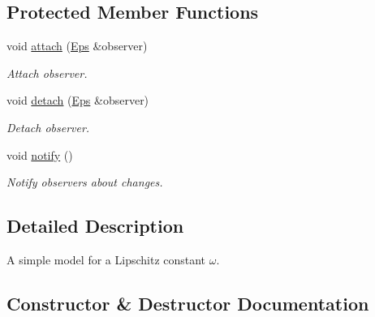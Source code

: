 \subsection*{Protected Member Functions}
\begin{DoxyCompactItemize}
\item 
\hypertarget{classSpacy_1_1Mixin_1_1MixinConnection_abb5520ee6b22dd993d78f142939a1ed4}{}void \hyperlink{classSpacy_1_1Mixin_1_1MixinConnection_abb5520ee6b22dd993d78f142939a1ed4}{attach} (\hyperlink{classSpacy_1_1Mixin_1_1Eps_a51dbe0b9cc950e0f3dfd34a481f08ae4_a51dbe0b9cc950e0f3dfd34a481f08ae4}{Eps} \&observer)\label{classSpacy_1_1Mixin_1_1MixinConnection_abb5520ee6b22dd993d78f142939a1ed4}

\begin{DoxyCompactList}\small\item\em Attach observer. \end{DoxyCompactList}\item 
\hypertarget{classSpacy_1_1Mixin_1_1MixinConnection_adda739590c487679c26f60e50aedb73f}{}void \hyperlink{classSpacy_1_1Mixin_1_1MixinConnection_adda739590c487679c26f60e50aedb73f}{detach} (\hyperlink{classSpacy_1_1Mixin_1_1Eps_a51dbe0b9cc950e0f3dfd34a481f08ae4_a51dbe0b9cc950e0f3dfd34a481f08ae4}{Eps} \&observer)\label{classSpacy_1_1Mixin_1_1MixinConnection_adda739590c487679c26f60e50aedb73f}

\begin{DoxyCompactList}\small\item\em Detach observer. \end{DoxyCompactList}\item 
\hypertarget{classSpacy_1_1Mixin_1_1MixinConnection_a1ddeaa78a3bb4a38c2cca36d1f99fe36}{}void \hyperlink{classSpacy_1_1Mixin_1_1MixinConnection_a1ddeaa78a3bb4a38c2cca36d1f99fe36}{notify} ()\label{classSpacy_1_1Mixin_1_1MixinConnection_a1ddeaa78a3bb4a38c2cca36d1f99fe36}

\begin{DoxyCompactList}\small\item\em Notify observers about changes. \end{DoxyCompactList}\end{DoxyCompactItemize}


\subsection{Detailed Description}
A simple model for a Lipschitz constant $\omega$. 

\subsection{Constructor \& Destructor Documentation}
\hypertarget{classSpacy_1_1LipschitzConstant_aa260cc7420e3f5cfc7fe2d78fb2aa7ad_aa260cc7420e3f5cfc7fe2d78fb2aa7ad}{}
